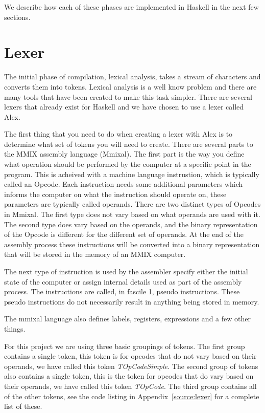 \documentclass[a4paper,11pt]{report}
\begin{document}
We describe how each of these phases are implemented in Haskell in the next few sections.
\clearpage
\section{Lexer}
The initial phase of compilation, lexical analysis, takes a stream of characters and converts them into tokens. Lexical analysis is a well know problem and there are many tools that have been created to make this task simpler. There are several lexers that already exist for Haskell and we have chosen to use a lexer called Alex\cite{alex}. 

The first thing that you need to do when creating a lexer with Alex is to determine what set of tokens you will need to create. There are several parts to the MMIX assembly language (Mmixal). The first part is the way you define what operation should be performed by the computer at a specific point in the program. This is acheived with a machine language instrustion, which is typically called an Opcode. Each instruction needs some additional parameters which informs the computer on what the instruction should operate on, these parameters are typically called operands. There are two distinct types of Opcodes in Mmixal. The first type does not vary based on what operands are used with it. The second type does vary based on the operands, and the binary representation of the Opcode is different for the different set of operands. At the end of the assembly process these instructions will be converted into a binary representation that will be stored in the memory of an MMIX computer.

The next type of instruction is used by the assembler specify either the initial state of the computer or assign internal details used as part of the assembly process. The instructions are called, in fascile 1\cite{knuth:aocp2}, pseudo instructions. These pseudo instructions do not necessarily result in anything being stored in memory.

The mmixal language also defines labels, registers, expressions and a few other things.

For this project we are using three basic groupings of tokens. The first group contains a single token, this token is for opcodes that do not vary based on their operands, we have called this token \textit{TOpCodeSimple}. The second group of tokens also contains a single token, this is the token for opcodes that do vary based on their operands, we have called this token \textit{TOpCode}. The third group contains all of the other tokens, see the code listing in Appendix~\ref{source:lexer} for a complete list of these.
\end{document}
